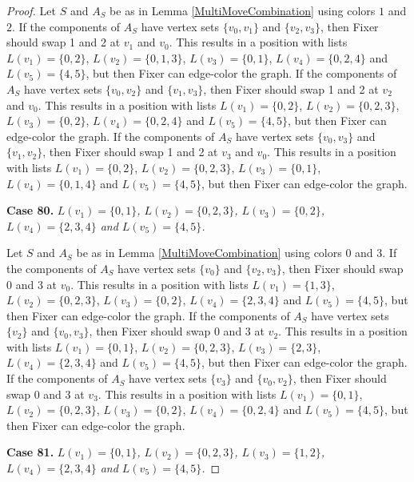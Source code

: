 \documentclass[12pt]{amsart}
\theoremstyle{plain}
\theoremstyle{definition}
\theoremstyle{remark}
\begin{document}
\begin{proof}
Let $S$ and $A_S$ be as in Lemma \ref{MultiMoveCombination} using colors $1$ and $2$. If the components of $A_S$ have vertex sets $\{v_0, v_1\}$ and $\{v_2, v_3\}$, then Fixer should swap 1 and 2 at $v_1$ and $v_0$. This results in a position with lists $L(v_1) = \{0, 2\}$, $L(v_2) = \{0, 1, 3\}$, $L(v_3) = \{0, 1\}$, $L(v_4) = \{0, 2, 4\}$ and $L(v_5) = \{4, 5\}$, but then Fixer can edge-color the graph.
If the components of $A_S$ have vertex sets $\{v_0, v_2\}$ and $\{v_1, v_3\}$, then Fixer should swap 1 and 2 at $v_2$ and $v_0$. This results in a position with lists $L(v_1) = \{0, 2\}$, $L(v_2) = \{0, 2, 3\}$, $L(v_3) = \{0, 2\}$, $L(v_4) = \{0, 2, 4\}$ and $L(v_5) = \{4, 5\}$, but then Fixer can edge-color the graph.
If the components of $A_S$ have vertex sets $\{v_0, v_3\}$ and $\{v_1, v_2\}$, then Fixer should swap 1 and 2 at $v_3$ and $v_0$. This results in a position with lists $L(v_1) = \{0, 2\}$, $L(v_2) = \{0, 2, 3\}$, $L(v_3) = \{0, 1\}$, $L(v_4) = \{0, 1, 4\}$ and $L(v_5) = \{4, 5\}$, but then Fixer can edge-color the graph.

\noindent\textbf{Case 80.  }\textit{$L(v_1) = \{0, 1\}$, $L(v_2) = \{0, 2, 3\}$, $L(v_3) = \{0, 2\}$, $L(v_4) = \{2, 3, 4\}$ and $L(v_5) = \{4, 5\}$.}

Let $S$ and $A_S$ be as in Lemma \ref{MultiMoveCombination} using colors $0$ and $3$. If the components of $A_S$ have vertex sets $\{v_0\}$ and $\{v_2, v_3\}$, then Fixer should swap 0 and 3 at $v_0$. This results in a position with lists $L(v_1) = \{1, 3\}$, $L(v_2) = \{0, 2, 3\}$, $L(v_3) = \{0, 2\}$, $L(v_4) = \{2, 3, 4\}$ and $L(v_5) = \{4, 5\}$, but then Fixer can edge-color the graph.
If the components of $A_S$ have vertex sets $\{v_2\}$ and $\{v_0, v_3\}$, then Fixer should swap 0 and 3 at $v_2$. This results in a position with lists $L(v_1) = \{0, 1\}$, $L(v_2) = \{0, 2, 3\}$, $L(v_3) = \{2, 3\}$, $L(v_4) = \{2, 3, 4\}$ and $L(v_5) = \{4, 5\}$, but then Fixer can edge-color the graph.
If the components of $A_S$ have vertex sets $\{v_3\}$ and $\{v_0, v_2\}$, then Fixer should swap 0 and 3 at $v_3$. This results in a position with lists $L(v_1) = \{0, 1\}$, $L(v_2) = \{0, 2, 3\}$, $L(v_3) = \{0, 2\}$, $L(v_4) = \{0, 2, 4\}$ and $L(v_5) = \{4, 5\}$, but then Fixer can edge-color the graph.

\noindent\textbf{Case 81.  }\textit{$L(v_1) = \{0, 1\}$, $L(v_2) = \{0, 2, 3\}$, $L(v_3) = \{1, 2\}$, $L(v_4) = \{2, 3, 4\}$ and $L(v_5) = \{4, 5\}$.}


\end{proof}
\end{document}
